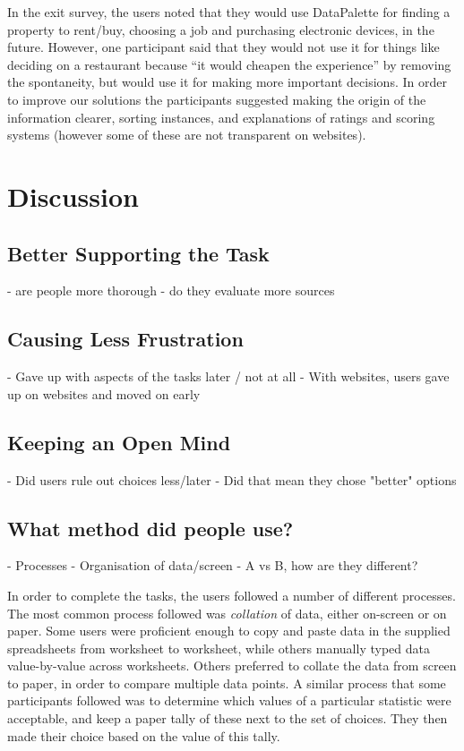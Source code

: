 \documentclass{sigchi}
\begin{document}
In the exit survey, the users noted that they would use DataPalette for finding a property to rent/buy, choosing a job and purchasing electronic devices, in the future.  However, one participant said that they would not use it for things like deciding on a restaurant because ``it would cheapen the experience'' by removing the spontaneity, but would use it for making more important decisions.  In order to improve our solutions the participants suggested making the origin of the information clearer, sorting instances, and explanations of ratings and scoring systems (however some of these are not transparent on websites).

\section{Discussion}

\subsection{Better Supporting the Task}

- are people more thorough
- do they evaluate more sources

\subsection{Causing Less Frustration}

- Gave up with aspects of the tasks later / not at all
- With websites, users gave up on websites and moved on early

\subsection{Keeping an Open Mind}

- Did users rule out choices less/later
- Did that mean they chose "better" options

\subsection{What method did people use?}

- Processes
- Organisation of data/screen
- A vs B, how are they different?



In order to complete the tasks, the users followed a number of different processes. The most common process followed
was {\it collation} of data, either on-screen or on paper. Some users were proficient enough to copy and paste data
in the supplied spreadsheets from worksheet to worksheet, while others manually typed data value-by-value across worksheets.
Others preferred to collate the data from screen to paper, in order to compare multiple data points. A similar process that
some participants followed was to determine which values of a particular statistic were acceptable, and keep a paper tally
of these next to the set of choices. They then made their choice based on the value of this tally.
\end{document}
